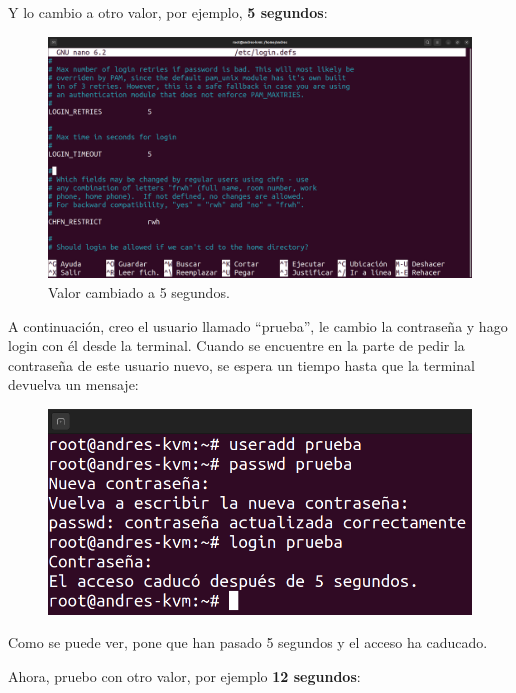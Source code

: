 \documentclass{article}
\begin{document}
\bigskip

Y lo cambio a otro valor, por ejemplo, \textbf{5 segundos}:

\begin{figure}[H]
    \includegraphics[width=\textwidth]{imagenes/tout5.png}
    \caption{Valor cambiado a 5 segundos.}
\end{figure}

\newpage

A continuación, creo el usuario llamado ``prueba'', le cambio la contraseña y hago login con él desde la terminal. Cuando se encuentre en la parte de pedir la contraseña de este usuario nuevo, se espera un tiempo hasta que la terminal devuelva un mensaje:

\begin{figure}[H]
    \includegraphics[width=\textwidth]{imagenes/tout5login.png}
\end{figure}

Como se puede ver, pone que han pasado 5 segundos y el acceso ha caducado.

\bigskip

Ahora, pruebo con otro valor, por ejemplo \textbf{12 segundos}:
\end{document}
